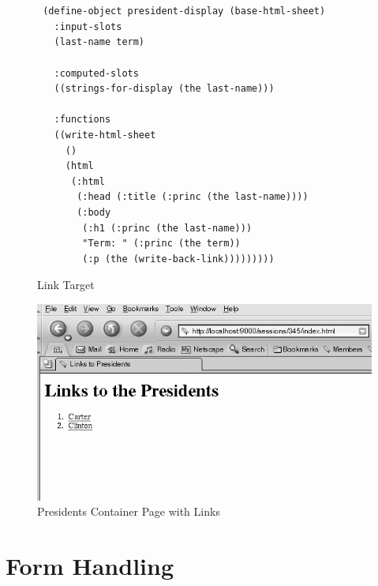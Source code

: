 \documentclass [11pt]{book}
\begin{document}
\begin{figure}
\begin{lrbox}{\boxedverb}
\begin{minipage}{\linewidth}

\begin{verbatim}

 
 (define-object president-display (base-html-sheet)
   :input-slots
   (last-name term)

   :computed-slots
   ((strings-for-display (the last-name)))
  
   :functions
   ((write-html-sheet
     ()
     (html
      (:html
       (:head (:title (:princ (the last-name))))
       (:body
        (:h1 (:princ (the last-name)))
        "Term: " (:princ (the term))
        (:p (the (write-back-link)))))))))

\end{verbatim}
\end{minipage}
\end{lrbox}
\fbox{\usebox{\boxedverb}}

\caption{Link Target}

\label{code:link-target}

\end{figure}

\begin{figure}
\begin{center}
\includegraphics{../images/presidents-container.png}
\end{center}

\caption{Presidents Container Page with Links}

\label{fig:presidents-container}

\end{figure}


\section{Form Handling}
\end{document}
